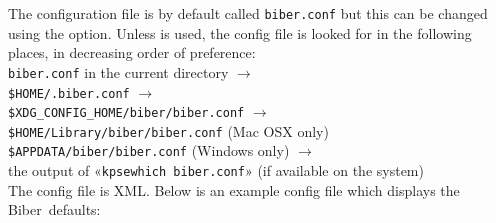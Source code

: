 \documentclass{ltxdockit}
\newcommand*{\biber}{Biber\xspace}
\begin{document}
The configuration file is by default called \verb+biber.conf+ but this can
be changed using the  option. Unless
 is used, the config file is
looked for in the following places, in decreasing order of preference:\\[2ex]

\noindent \verb+biber.conf+ in the current directory $\rightarrow$\\
\hspace*{1em}\verb+$HOME/.biber.conf+ $\rightarrow$\\
\hspace*{2em}\verb+$XDG_CONFIG_HOME/biber/biber.conf+ $\rightarrow$\\
\hspace*{3em}\verb+$HOME/Library/biber/biber.conf+ (Mac OSX only)\\
\hspace*{3em}\verb+$APPDATA/biber/biber.conf+ (Windows only) $\rightarrow$\\
\hspace*{4em}the output of «\verb+kpsewhich biber.conf+» (if available on the
system)\\[2ex]

\noindent The config file is XML. Below is
an example config file which displays the \biber\ defaults:
\end{document}
